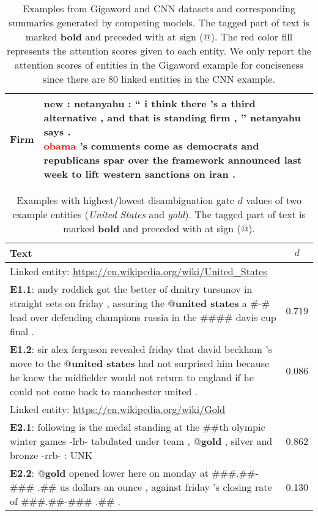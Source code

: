 \documentclass[11pt,a4paper]{article}
\begin{document}
\begin{table*}[htbp]
\begin{subtable}{\textwidth}
\begin{tabularx}{\textwidth}{|l|p{68.3em}|}
    Firm & 
          \makecell[l]{
          new : netanyahu : `` i think there 's a third alternative , and that is standing firm , '' netanyahu says . \\
          \textcolor{red}{obama} 's comments come as democrats and republicans spar over the framework announced last week to lift western sanctions on iran .} \\ \hline
    \end{tabularx}\end{subtable}
  \caption{Examples from Gigaword and CNN datasets and corresponding summaries generated by competing models. The tagged part of text is marked \textbf{bold} and preceded with at sign (@). The red color fill represents the attention scores given to each entity. We only report the attention scores of entities in the Gigaword example for conciseness since there are 80 linked entities in the CNN example.}
  \label{tab:sample}\end{table*}

\begin{table}[ht]
    \tiny
    \centering
    \begin{tabularx}{0.47\textwidth}{|X|c|}
        \hline
        Text & $d$ \\ \hline
        \hline
        \multicolumn{2}{|l|}{Linked entity: \url{https://en.wikipedia.org/wiki/United_States}} \\
        \hline
        \textbf{E1.1}: andy roddick got the better of dmitry tursunov in straight sets on friday , assuring the @\textbf{united states} a \#-\# lead over defending champions russia in the \#\#\#\# davis cup final . & 0.719 \\ \hline
        \textbf{E1.2}: sir alex ferguson revealed friday that david beckham 's move to the @\textbf{united states} had not surprised him because he knew the midfielder would not return to england if he could not come back to manchester united . & 0.086 \\ \hline
        \hline
        \multicolumn{2}{|l|}{Linked entity: \url{https://en.wikipedia.org/wiki/Gold}} \\
        \hline
        \textbf{E2.1}: following is the medal standing at the \#\#th olympic winter games -lrb- tabulated under team , @\textbf{gold} , silver and bronze -rrb- : UNK & 0.862 \\ \hline
        \textbf{E2.2}: @\textbf{gold} opened lower here on monday at \#\#\#.\#\#-\#\#\# .\#\# us dollars an ounce , against friday 's closing rate of \#\#\#.\#\#-\#\#\# .\#\# . & 0.130 \\ \hline
    \end{tabularx}
    \caption{Examples with highest/lowest disambiguation gate $d$ values of two example entities (\textit{United States} and \textit{gold}). The tagged part of text is marked \textbf{bold} and preceded with at sign (@).}
    \label{tab:disambig}
\end{table}
\end{document}
